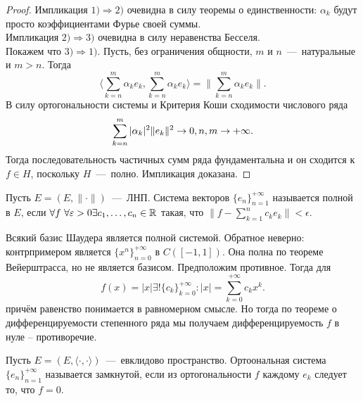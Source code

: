 \begin{proof}
    Импликация $1) \Rightarrow 2)$ очевидна в силу теоремы о единственности: $\alpha_k$ будут просто коэффициентами Фурье своей суммы. \\
    Импликация $2) \Rightarrow 3)$ очевидна в силу неравенства Бесселя. \\
    Покажем что $3) \Rightarrow 1)$.
    Пусть, без ограничения общности, $m$ и $n$~---~натуральные и $m > n$.
    Тогда
    \begin{equation*}
        \bigr\langle \sum\limits_{k = n}^{m} \alpha_k e_k, \sum\limits_{k = n}^m \alpha_k e_k \bigr\rangle = \big\|\sum\limits_{k = n}^m \alpha_k e_k\big\|.
    \end{equation*}
    В силу ортогональности системы и Критерия Коши сходимости числового ряда
    \[
        \sum\limits_{k = n}^m |\alpha_k|^2\|e_k\|^2 \rightarrow 0, n, m \rightarrow +\infty.
    \]
    Тогда последовательность частичных сумм ряда фундаментальна и он сходится к $f \in H$, поскольку $H$~---~полно.
    Импликация доказана.
\end{proof}
\begin{definition}
    Пусть $E = (E,  \|\cdot\|)$~---~ЛНП.
    Система векторов $\{e_n\}_{n = 1}^{+\infty}$ называется полной в $E$, если $\forall f \ \forall \varepsilon > 0 \exists c_1, \ldots, c_n \in \mathbb{R}$
    такая, что $\|f - \sum\limits_{k = 1}^n c_k e_k\| < \epsilon$.
\end{definition}
\begin{note}
    Всякий базис Шаудера является полной системой.
    Обратное неверно: контрпримером является $\{x^n\}_{n = 0}^{+\infty}$ в $C([-1, 1])$.
    Она полна по теореме Вейерштрасса, но не является базисом.
    Предположим противное.
    Тогда для
    \[
        f(x) = |x| \exists ! \{c_k\}_{k = 0}^{+\infty}: |x| = \sum\limits_{k = 0}^{+\infty} c_k x^k.
    \]
    причём равенство понимается в равномерном смысле.
    Но тогда по теореме о дифференцируемости степенного ряда мы получаем дифференцируемость $f$ в нуле -- противоречие.
\end{note}
\begin{definition}
    Пусть $E = (E, \langle \cdot, \cdot \rangle)$~---~евклидово пространство.
    Ортоональная система $\{e_n\}_{n = 1}^{+\infty}$ называется замкнутой, если из ортогональности $f$ каждому $e_k$ следует то, что $f = 0$.
\end{definition}
